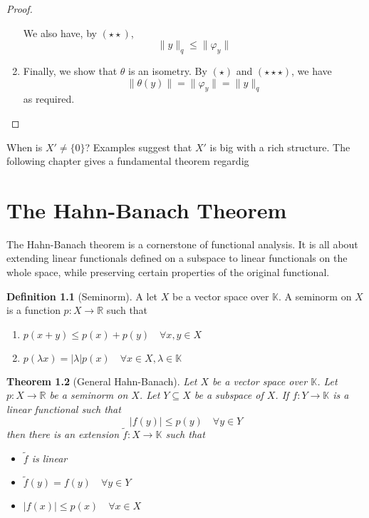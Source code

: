 \documentclass[justified]{tufte-book}
\theoremstyle{plain}%
\newtheorem{thm}{Theorem}[chapter]
\theoremstyle{definition}
\newtheorem{defn}[thm]{Definition}
\theoremstyle{remark}
\newcommand{\R}{\mathbb{R}}
\newcommand{\K}{\mathbb{K}}
\renewcommand{\phi}{\varphi}
\begin{document}
\begin{proof}
\begin{enumerate}[(1)]
      We also have, by $(\star \star)$,\[
          \| y \|_q \leq \| \phi_y \|
      \] 
      \item Finally, we show that $\theta$ is an isometry.  By $(\star)$ and $(\star \star \star)$, we have \[
          \| \theta(y) \| = \| \phi_y \| = \| y \|_q 
      \] as required.\qedhere
       
  \end{enumerate} 
\end{proof}   

  When is $X' \neq \{ 0 \}$?  Examples suggest that $X'$ is big with a rich structure.  The following chapter gives a fundamental theorem regardig  

\chapter{The Hahn-Banach Theorem}
The Hahn-Banach theorem is a cornerstone of functional analysis.  It is all about extending linear functionals defined on a subspace to linear functionals on the whole space, while preserving certain properties of the original functional.

\begin{defn}[Seminorm]
A let $X$ be a vector space over $\K$.  A seminorm on $X$ is a function $p : X \rightarrow \R$ such that 
\begin{enumerate}[(1)]
  \item $p(x+y) \leq p(x) + p(y) \quad \forall x,y \in X$
  \item $p(\lambda x) = | \lambda | p(x) \quad \forall x \in X, \lambda \in \K$
\end{enumerate}
\end{defn}

\begin{thm}[General Hahn-Banach]
  Let $X$ be a vector space over $\K$.  Let $p: X \rightarrow \R$ be a seminorm on $X$.  Let $Y \subseteq X$ be a subspace of $X$.  If $f : Y \rightarrow \K$ is a linear functional such that \[
      | f(y) | \leq p(y) \quad \forall y \in Y
  \] then there is an extension $\tilde{f} : X \rightarrow \K$ such that 
  \begin{itemize}
      \item $\tilde{f}$ is linear
      \item $\tilde f (y) = f(y) \quad \forall y \in Y$
      \item $|f(x)| \leq p(x) \quad \forall x \in X$
  \end{itemize}
\end{thm}
\end{document}
